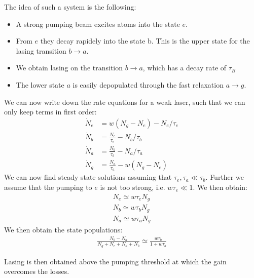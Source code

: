 \documentclass[10pt]{article}
\begin{document}
The idea of such a system is the following:
\begin{itemize}
\item A strong pumping beam excites atoms into the state $e$.
\item From $e$ they decay rapidely into the state b. This is the upper state for the lasing transition $b\rightarrow a$.
\item We obtain lasing on the transition $b\rightarrow a$, which has a decay rate of $\tau_B$
\item The lower state $a$ is easily depopulated through the fast relaxation $a\rightarrow g$.
\end{itemize}
We can now write down the rate equations for a weak laser, such that we can only keep terms in first order:
\begin{align}
\dot{N}_e &= w(N_g-N_e)-N_e/\tau_e\\
\dot{N}_b &= \frac{N_e}{\tau_e}-N_b/\tau_b\\ 
\dot{N}_a &= \frac{N_b}{\tau_b}-N_a/\tau_a\\
\dot{N}_g &= \frac{N_a}{\tau_a}-w(N_g-N_e)
\end{align}
We can now find steady state solutions assuming that $\tau_e, \tau_a \ll \tau_b$. Further we assume that the pumping to $e$ is not too strong, i.e. $w \tau_e\ll1$. We then obtain:
\begin{align}
N_e \simeq w\tau_e N_g\\
N_b \simeq w\tau_b N_g\\
N_a \simeq w\tau_a N_g
\end{align}
We then obtain the state populations:
\begin{align}
\frac{N_b-N_a}{N_g + N_e + N_a + N_b}\simeq \frac{w\tau_b}{1+w\tau_b}
\end{align}

Lasing is then obtained above the pumping threshold at which the gain overcomes the losses.
\end{document}
